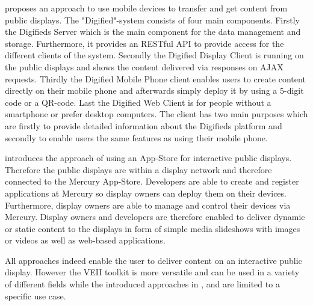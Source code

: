 \cite{Alt2011} proposes an approach to use mobile devices to transfer and get content from public displays. The "Digified"-system consists of four main components. Firstly the Digifieds Server which is the main component for the data management and storage. Furthermore, it provides an RESTful API to provide access for the different clients of the system. Secondly the Digified Display Client is running on the public displays and shows the content delivered via responses on AJAX requests. Thirdly the Digified Mobile Phone client enables users to create content directly on their mobile phone and afterwards simply deploy it by using a 5-digit code or a QR-code. Last the Digified Web Client is for people without a smartphone or prefer desktop computers. The client has two main purposes which are firstly to provide detailed information about the Digifieds platform and secondly to enable users the same features as using their mobile phone.

\cite{Clinch2014} introduces the approach of using an App-Store for interactive public displays. Therefore the public displays are within a display network and therefore connected to the Mercury App-Store.  Developers are able to create and register applications at Mercury so display owners can deploy them on their devices. Furthermore, display owners are able to manage and control their devices via Mercury. Display owners and developers are therefore enabled to deliver dynamic or static content to the displays in form of simple media slideshows with images or videos as well as web-based applications.

All approaches indeed enable the user to deliver content on an interactive public display. However the VEII toolkit is more versatile and can be used in a variety of different fields while the introduced approaches in \cite{Styliaras2007}, \cite{Alt2011} and \cite{Clinch2014} are limited to a specific use case.
